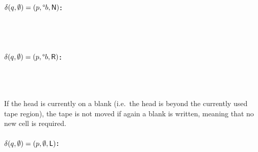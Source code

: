 \documentclass[a4paper,UKenglish,cleveref, autoref]{lipics-v2019}
\begin{document}
\paragraph*{$\delta(q, \emptyset) = (p, \degree b, \textsf{N})$:}
\begin{center}
   \\[3ex]
   \\[3ex]
\end{center}

\paragraph*{$\delta(q, \emptyset) = (p, \degree b, \textsf{R})$:}
\begin{center}
   \\[3ex]
   \\[3ex]
\end{center}

If the head is currently on a blank (i.e.\ the head is beyond the currently used tape region), the tape is not moved if again a blank is written, meaning that no new cell is required.
\paragraph*{$\delta(q, \emptyset) = (p, \emptyset, \textsf{L})$:}
\begin{center}
   \\[3ex]
   \\[3ex]
\end{center}
\end{document}
